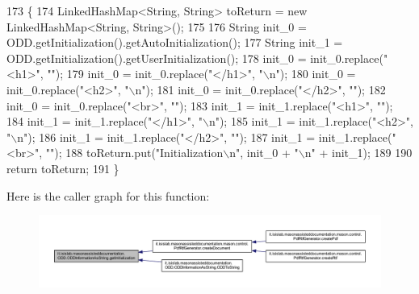 \begin{DoxyCode}
173                                                                    \{
174         LinkedHashMap<String, String> toReturn = \textcolor{keyword}{new} LinkedHashMap<String, String>();
175 
176         String init\_0 = ODD.getInitialization().getAutoInitialization();
177         String init\_1 = ODD.getInitialization().getUserInitialization();
178         init\_0 = init\_0.replace(\textcolor{stringliteral}{"<h1>"}, \textcolor{stringliteral}{""});
179         init\_0 = init\_0.replace(\textcolor{stringliteral}{"</h1>"}, \textcolor{stringliteral}{"\(\backslash\)n"});
180         init\_0 = init\_0.replace(\textcolor{stringliteral}{"<h2>"}, \textcolor{stringliteral}{"\(\backslash\)n"});
181         init\_0 = init\_0.replace(\textcolor{stringliteral}{"</h2>"}, \textcolor{stringliteral}{""});
182         init\_0 = init\_0.replace(\textcolor{stringliteral}{"<br>"}, \textcolor{stringliteral}{""});
183         init\_1 = init\_1.replace(\textcolor{stringliteral}{"<h1>"}, \textcolor{stringliteral}{""});
184         init\_1 = init\_1.replace(\textcolor{stringliteral}{"</h1>"}, \textcolor{stringliteral}{"\(\backslash\)n"});
185         init\_1 = init\_1.replace(\textcolor{stringliteral}{"<h2>"}, \textcolor{stringliteral}{"\(\backslash\)n"});
186         init\_1 = init\_1.replace(\textcolor{stringliteral}{"</h2>"}, \textcolor{stringliteral}{""});
187         init\_1 = init\_1.replace(\textcolor{stringliteral}{"<br>"}, \textcolor{stringliteral}{""});
188         toReturn.put(\textcolor{stringliteral}{"Initialization\(\backslash\)n"}, init\_0 + \textcolor{stringliteral}{"\(\backslash\)n"} + init\_1);
189         
190         \textcolor{keywordflow}{return} toReturn;
191     \}
\end{DoxyCode}


Here is the caller graph for this function\-:\nopagebreak
\begin{figure}[H]
\begin{center}
\leavevmode
\includegraphics[width=350pt]{classit_1_1isislab_1_1masonassisteddocumentation_1_1_o_d_d_1_1_o_d_d_information_as_string_aa3767e51964fecba08ec6e1669b77691_icgraph}
\end{center}
\end{figure}


